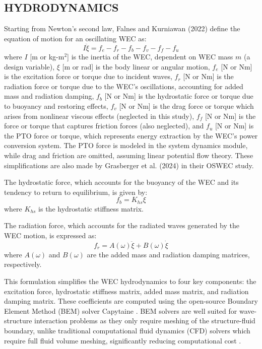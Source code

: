 \documentclass[twocolumn,10pt]{asme2e}
\begin{document}
\subsection{HYDRODYNAMICS} \label{sec:hydro}
Starting from Newton's second law, Falnes and Kurniawan (2022) \cite{falnes2022} define the equation of motion for an oscillating WEC as:
\begin{equation}
    \label{eq:cummins}
    I\ddot{\xi} = f_e - f_r - f_b - f_v - f_f - f_u  
\end{equation}
\noindent where $I$ [m or kg-m$^2$] is the inertia of the WEC, dependent on WEC mass $m$ (a design variable), $\xi$ [m or rad] is the body linear or angular motion, $f_e$ [N or Nm] is the excitation force or torque due to incident waves, $f_r$ [N or Nm] is the radiation force or torque due to the WEC’s oscillations, accounting for added mass and radiation damping, $f_b$ [N or Nm] is the hydrostatic force or torque due to buoyancy and restoring effects, $f_v$ [N or Nm] is the drag force or torque which arises from nonlinear viscous effects (neglected in this study), $f_f$ [N or Nm] is the force or torque that captures friction forces (also neglected), and $f_u$ [N or Nm] is the PTO force or torque, which represents energy extraction by the WEC’s power conversion system. The PTO force is modeled in the system dynamics module, while drag and friction are omitted, assuming linear potential flow theory. These simplifications are also made by Grasberger et al. (2024) \cite{Grasberger2024} in their OSWEC study. 

The hydrostatic force, which accounts for the buoyancy of the WEC and its tendency to return to equilibrium, is given by: 
\begin{equation}
    \label{eq:hydrostatic}
    f_{b} = K_{hs} \xi
\end{equation}
\noindent where $K_{hs}$ is the hydrostatic stiffness matrix.

The radiation force, which accounts for the radiated waves generated by the WEC motion, is expressed as:
\begin{equation}
    \label{eq:radiation}
    f_r = A(\omega) \ddot{\xi} + B(\omega) \dot{\xi}
\end{equation}
\noindent where $A(\omega)$ and $B(\omega)$ are the added mass and radiation damping matrices, respectively.

This formulation simplifies the WEC hydrodynamics to four key components: the excitation force, hydrostatic stiffness matrix, added mass matrix, and radiation damping matrix. These coefficients are computed using the open-source Boundary Element Method (BEM) solver Capytaine \cite{ancellin_capytaine_2019}. BEM solvers are well suited for wave-structure interaction problems as they only require meshing of the structure-fluid boundary, unlike traditional computational fluid dynamics (CFD) solvers which require full fluid volume meshing, significantly reducing computational cost \cite{bem_wave}.
\end{document}
